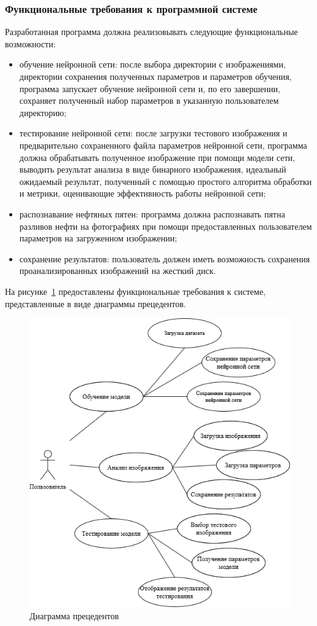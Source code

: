 \subsubsection{Функциональные требования к программной системе}

Разработанная программа должна реализовывать следующие функциональные возможности:

\begin{itemize}
	\item обучение нейронной сети: после выбора директории с изображениями, директории сохранения полученных параметров и параметров обучения, программа запускает обучение нейронной сети и, по его завершении, сохраняет полученный набор параметров в указанную пользователем директорию;
	\item тестирование нейронной сети: после загрузки тестового изображения и предварительно сохраненного файла параметров нейронной сети, программа должна обрабатывать полученное изображение при помощи модели сети, выводить результат анализа в виде бинарного изображения, идеальный ожидаемый результат, полученный с помощью простого алгоритма обработки и метрики, оценивающие эффективность работы нейронной сети;
	\item распознавание нефтяных пятен: программа должна распознавать пятна разливов нефти на фотографиях при помощи предоставленных пользователем параметров на загруженном изображении;
	\item сохранение результатов: пользователь должен иметь возможность сохранения проанализированных изображений на жесткий диск.	
\end{itemize}

На рисунке~\ref{fig:usecase} предоставлены функциональные требования к системе, представленные в виде диаграммы прецедентов.

\begin{figure}[H]
	\centering
	\includegraphics[width=0.7\linewidth]{"images/сценарии использования"}
	\caption{Диаграмма прецедентов}
	\label{fig:usecase}
\end{figure}

